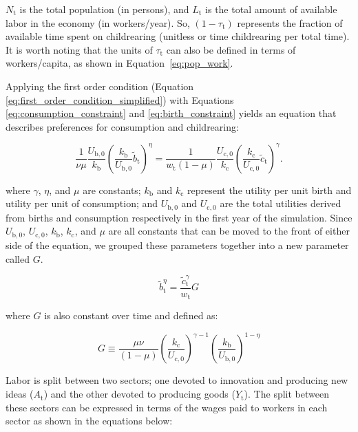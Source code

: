 \documentclass[letterpaper,12pt]{article}
\begin{document}
\noindent $N_\mathrm{t}$ is the total population (in persons), and $L_\mathrm{t}$ is the total amount of available labor in the economy (in workers/year). So, $(1-\tau_\mathrm{t})$ represents the fraction of available time spent on childrearing (unitless or time childrearing per total time). It is worth noting that the units of $\tau_\mathrm{t}$ can also be defined in terms of workers/capita, as shown in Equation~\ref{eq:pop_work}.

Applying the first order condition (Equation \ref{eq:first_order_condition_simplified}) with Equations \ref{eq:consumption_constraint} and \ref{eq:birth_constraint} yields an equation that describes preferences for consumption and childrearing:

\begin{equation} \label{eq:FOC_and_time_constraints}
	\frac{1}{\nu \mu} \frac{U_\mathrm{b,0}}{k_\mathrm{b}} \left( \frac{k_\mathrm{b}}{U_\mathrm{b,0}} \tilde b_\mathrm{t} \right) ^{\eta} 
	= \frac{1}{w_\mathrm{t}(1-\mu)} \frac{U_\mathrm{c,0}}{k_\mathrm{c}}  \left( \frac{k_\mathrm{c}}{U_\mathrm{c,0}} \tilde c_\mathrm{t} \right)^\gamma .
\end{equation}

\noindent where $\gamma$, $\eta$, and $\mu$ are constants; $k_\mathrm{b}$ and $k_\mathrm{c}$ represent the utility per unit birth and utility per unit of consumption; and $U_\mathrm{b,0}$ and $U_\mathrm{c,0}$ are the total utilities derived from births and consumption respectively in the first year of the simulation. Since $U_\mathrm{b,0}$, $U_\mathrm{c,0}$, $k_\mathrm{b}$, $k_\mathrm{c}$, and $\mu$ are all constants that can be moved to the front of either side of the equation, we grouped these parameters together into a new parameter called $G$.

\begin{equation} \label{eq:FOC_with_G}
 	\tilde b_\mathrm{t}^\eta = \frac{\tilde c_\mathrm{t}^\gamma}{w_\mathrm{t}} G
\end{equation}

\noindent where $G$ is also constant over time and defined as:

\begin{equation} \label{eq:G}
	G \equiv \frac{\mu \nu}{(1-\mu)} \left( \frac{k_\mathrm{c}}{U_\mathrm{c,0}} \right) ^{\gamma-1} \left( \frac{k_\mathrm{b}}{U_\mathrm{b,0}} \right) ^{1-\eta}
\end{equation}

Labor is split between two sectors; one devoted to innovation and producing new ideas ($A_\mathrm{t}$) and the other devoted to producing goods ($Y_\mathrm{t}$). The split between these sectors can be expressed in terms of the wages paid to workers in each sector as shown in the equations below:
\end{document}
